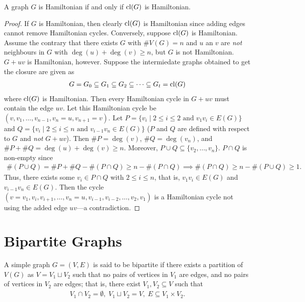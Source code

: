 \begin{lemma}
    A graph $G$ is Hamiltonian if and only if $\operatorname{cl}(G)$ is Hamiltonian.
\end{lemma}
\begin{proof}
    If $G$ is Hamiltonian, then clearly $\operatorname{cl}(G)$ is Hamiltonian since adding edges cannot remove Hamiltonian cycles. Conversely, suppose $\operatorname{cl}(G)$ is Hamiltonian. Assume the contrary that there exists $G$ with $\#V(G) = n$ and $u$ an $v$ are \textit{not} neighbours in $G$ with $\deg(u)+\deg(v) \geq n$, but $G$ is not Hamiltonian. $G+uv$ is Hamiltonian, however. Suppose the intermiedate graphs obtained to get the closure are given as
    \begin{align}
        G = G_{0} \subseteq G_{1} \subseteq G_{2} \subseteq \cdots \subseteq G_{t} = \operatorname{cl}(G)
    \end{align}
    where $\operatorname{cl}(G)$ is Hamiltonian. Then every Hamiltonian cycle in $G+uv$ must contain the edge $uv$. Let this Hamiltonian cycle be $(v,v_{1},\ldots,v_{n-1},v_{n} = u,v_{n+1}=v)$. Let $P = \{v_{i} \mid 2 \leq i \leq 2 \text{ and } v_{1}v_{i} \in E(G)\}$ and $Q = \{v_{i} \mid 2 \leq i \leq n \text{ and } v_{i-1}v_{n} \in E(G)\}$ ($P$ and $Q$ are defined with respect to $G$ and \textit{not} $G+uv$). Then $\#P = \deg(v)$, $\#Q = \deg(v_{n})$, and $\#P+\#Q = \deg(u) + \deg(v) \geq n$. Moreover, $P \cup Q \subseteq \{v_{2},\ldots,v_{n}\}$. $P \cap Q$ is non-empty since
    \begin{align}
        \#(P \cup Q) = \#P + \#Q - \#(P \cap Q) \geq n-\#(P \cap Q) \implies \#(P \cap Q) \geq n-\#(P \cup Q) \geq 1.
    \end{align}
    Thus, there exists some $v_{i} \in P \cap Q$ with $2 \leq i \leq n$, that is, $v_{1}v_{i} \in E(G)$ and $v_{i-1}v_{n} \in E(G)$. Then the cycle $(v=v_{1},v_{i},v_{i+1},\ldots,v_{n}=u,v_{i-1},v_{i-2},\ldots,v_{2},v_{1})$ is a Hamiltonian cycle not using the added edge $uv$---a contradiction.
\end{proof}

\section{Bipartite Graphs}

A simple graph $G = (V,E)$ is said to be bipartite if there exists a partition of $V(G)$ as $V = V_{1} \sqcup V_{2}$ such that no pairs of vertices in $V_{1}$ are edges, and no pairs of vertices in $V_{2}$ are edges; that is, there exist $V_{1},V_{2} \subseteq V$ such that
\begin{align}
    V_{1} \cap V_{2} = \emptyset,\; V_{1} \sqcup V_{2} = V,\; E \subseteq V_{1} \times V_{2}.
\end{align}

